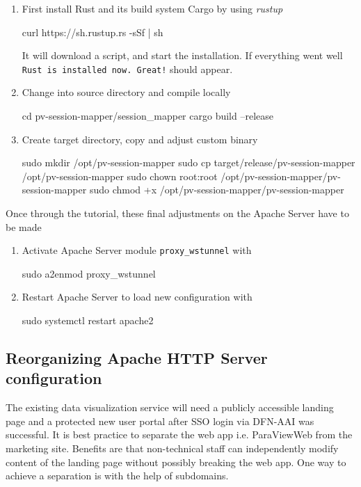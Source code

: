 \begin{enumerate}
    \item First install Rust and its build system Cargo by using \textit{rustup}
    \begin{terminal}
        curl https://sh.rustup.rs -sSf | sh
    \end{terminal}
    It will download a script, and start the installation. If everything went
    well \texttt{Rust is installed now. Great!} should appear.
    \item Change into source directory and compile locally
    \begin{terminal}
        cd pv-session-mapper/session_mapper
        cargo build --release
    \end{terminal}
    \item Create target directory, copy and adjust custom binary
    \begin{terminal}
        sudo mkdir /opt/pv-session-mapper
        sudo cp target/release/pv-session-mapper /opt/pv-session-mapper
        sudo chown root:root /opt/pv-session-mapper/pv-session-mapper
        sudo chmod +x /opt/pv-session-mapper/pv-session-mapper
    \end{terminal}
\end{enumerate}

Once through the tutorial, these final adjustments on the Apache Server have to
be made

\begin{enumerate}
    \item Activate Apache Server module \texttt{proxy\_wstunnel} with 
    \begin{terminal}
        sudo a2enmod proxy_wstunnel
    \end{terminal}
    \item Restart Apache Server to load new configuration with
    \begin{terminal}
        sudo systemctl restart apache2
    \end{terminal}
\end{enumerate}

\subsection{Reorganizing Apache HTTP Server configuration}

The existing data visualization service will need a publicly accessible landing
page and a protected new user portal after SSO login via DFN-AAI was successful.
It is best practice to separate the web app i.e. ParaViewWeb from the marketing
site. Benefits are that non-technical staff can independently modify content of
the landing page without possibly breaking the web app. One way to achieve a
separation is with the help of subdomains. 

